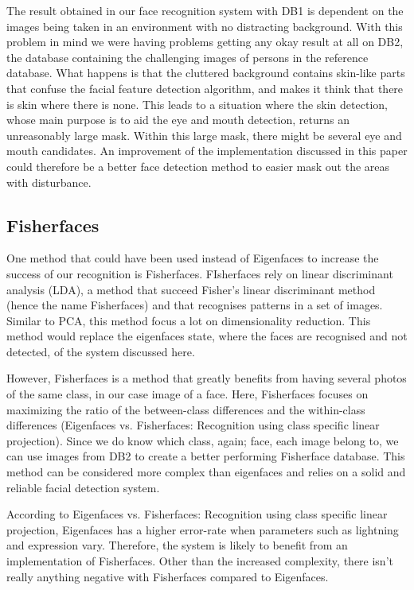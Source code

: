 The result obtained in our face recognition system with DB1 is dependent on the images being taken in an environment with no distracting background. With this problem in mind we were having problems getting any okay result at all on DB2, the database containing the challenging images of persons in the reference database. What happens is that the cluttered background contains skin-like parts that confuse the facial feature detection algorithm, and makes it think that there is skin where there is none. This leads to a situation where the skin detection, whose main purpose is to aid the eye and mouth detection, returns an unreasonably large mask. Within this large mask, there might be several eye and mouth candidates. An improvement of the implementation discussed in this paper could therefore be a better face detection method to easier mask out the areas with disturbance.

\subsection{Fisherfaces}
One method that could have been used instead of Eigenfaces to increase the success of our recognition is Fisherfaces. FIsherfaces rely on linear discriminant analysis (LDA), a method that succeed Fisher's linear discriminant method (hence the name Fisherfaces) and that recognises patterns in a set of images. Similar to PCA, this method focus a lot on dimensionality reduction. This method would replace the eigenfaces state, where the faces are recognised and not detected, of the system discussed here.

However, Fisherfaces is a method that greatly benefits from having several photos of the same class, in our case image of a face. Here, Fisherfaces focuses on maximizing the ratio of the between-class differences and the within-class differences (Eigenfaces vs. Fisherfaces: Recognition using class specific linear projection). Since we do know which class, again; face, each image belong to, we can use images from DB2 to create a better performing Fisherface database. This method can be considered more complex than eigenfaces and relies on a solid and reliable facial detection system.

According to Eigenfaces vs. Fisherfaces: Recognition using class specific linear projection, Eigenfaces has a higher error-rate when parameters such as lightning and expression vary. Therefore, the system is likely to benefit from an implementation of Fisherfaces. Other than the increased complexity, there isn’t really anything negative with Fisherfaces compared to Eigenfaces.

